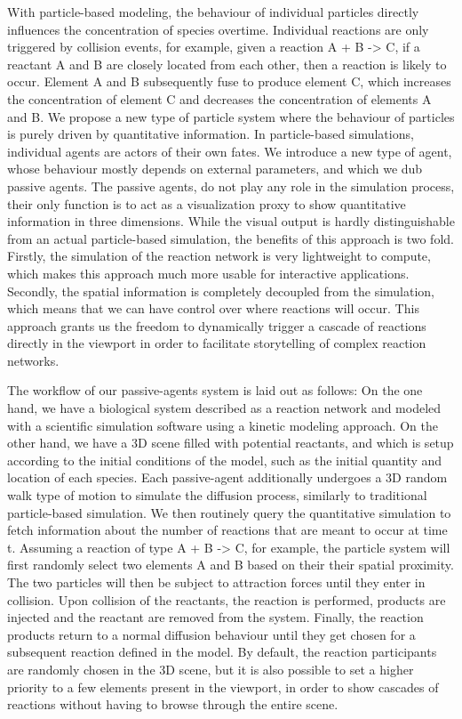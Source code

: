 With particle-based modeling, the behaviour of individual particles directly influences the concentration of species overtime.
Individual reactions are only triggered by collision events, for example, given a reaction A + B -> C, if a reactant A and B are closely located from each other, then a reaction is likely to occur.
Element A and B subsequently fuse to produce element C, which increases the concentration of element C and decreases the concentration of elements A and B.
We propose a new type of particle system where the behaviour of particles is purely driven by quantitative information.
In particle-based simulations, individual agents are actors of their own fates.
We introduce a new type of agent, whose behaviour mostly depends on external parameters, and which we dub passive agents.
The passive agents, do not play any role in the simulation process, their only function is to act as a visualization proxy to show quantitative information in three dimensions.
While the visual output is hardly distinguishable from an actual particle-based simulation, the benefits of this approach is two fold.
Firstly, the simulation of the reaction network is very lightweight to compute, which makes this approach much more usable for interactive applications.
Secondly, the spatial information is completely decoupled from the simulation, which means that we can have control over where reactions will occur.
This approach grants us the freedom to dynamically trigger a cascade of reactions directly in the viewport in order to facilitate storytelling of complex reaction networks.

The workflow of our passive-agents system is laid out as follows:
On the one hand, we have a biological system described as a reaction network and modeled with a scientific simulation software using a kinetic modeling approach.
On the other hand, we have a 3D scene filled with potential reactants, and which is setup according to the initial conditions of the model, such as the initial quantity and location of each species.
Each passive-agent additionally undergoes a 3D random walk type of motion to simulate the diffusion process, similarly to traditional particle-based simulation.
We then routinely query the quantitative simulation to fetch information about the number of reactions that are meant to occur at time t.
Assuming a reaction of type A + B -> C, for example, the particle system will first randomly select two elements A and B based on their their spatial proximity.
The two particles will then be subject to attraction forces until they enter in collision.
Upon collision of the reactants, the reaction is performed, products are injected and the reactant are removed from the system.
Finally, the reaction products return to a normal diffusion behaviour until they get chosen for a subsequent reaction defined in the model.
By default, the reaction participants are randomly chosen in the 3D scene, but it is also possible to set a higher priority to a few elements present in the viewport, in order to show cascades of reactions without having to browse through the entire scene.



